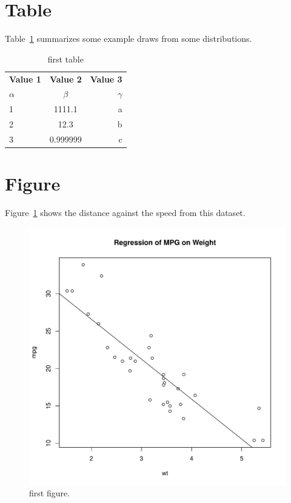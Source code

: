 \documentclass[12pt]{article}
\begin{document}
\lipsum[2]



\section{Table} 
\label{sec:tab}

Table~\ref{tab:table1} summarizes some example draws from some distributions.
\lipsum[3]


\begin{table}[h!]
  \begin{center}
    \caption{first table}
    \label{tab:table1}
    \begin{tabular}{l|c|r} 
      \textbf{Value 1} & \textbf{Value 2} & \textbf{Value 3}\\
      $\alpha$ & $\beta$ & $\gamma$ \\
      \hline
      1 & 1111.1 & a\\
      2 & 12.3 & b\\
      3 & 0.999999 & c\\
    \end{tabular}
  \end{center}
\end{table}





\section{Figure}
\label{sec:fig}

Figure~\ref{fig:plot} shows the distance against the speed from this dataset.


\begin{figure}[tbp]
  \centering
  \includegraphics[width=\textwidth]{mygraph.pdf}
  \caption{first figure.}
  \label{fig:plot}
\end{figure}
\end{document}

